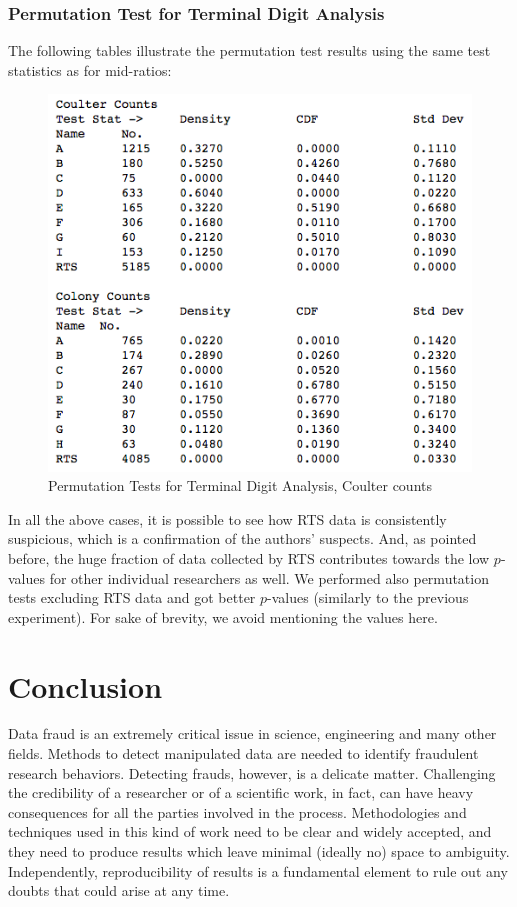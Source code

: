 \documentclass{article}
\begin{document}
    \subsubsection{Permutation Test for Terminal Digit
Analysis}\label{permutation-test-for-terminal-digit-analysis}

The following tables illustrate the permutation test results using the
same test statistics as for mid-ratios:

\begin{figure}[H]
\centering
\includegraphics[width=0.7\linewidth]{images/raaz_eq_perm_summary.png}
\caption{Permutation Tests for Terminal Digit Analysis, Coulter counts}
\end{figure}

In all the above cases, it is possible to see how RTS data is
consistently suspicious, which is a confirmation of the authors'
suspects. And, as pointed before, the huge fraction of data collected
by RTS contributes towards the low $p$-values for other individual
researchers as well. 
We performed also permutation tests excluding RTS data
and got better $p$-values (similarly to the previous experiment). 
For sake of brevity, we avoid mentioning the
values here.

    \section{Conclusion}\label{conclusion}

    Data fraud is an extremely critical issue in science, engineering and
many other fields. Methods to detect manipulated data are needed to
identify fraudulent research behaviors. Detecting frauds, however, is a
delicate matter. Challenging the credibility of a researcher or of a
scientific work, in fact, can have heavy consequences for all the parties
involved in the process. Methodologies and techniques used in this kind
of work need to be clear and widely accepted, and they need to produce
results which leave minimal (ideally no) space to ambiguity. Independently, reproducibility of
results is a fundamental element to rule out any doubts that could arise
at any time.
\end{document}
